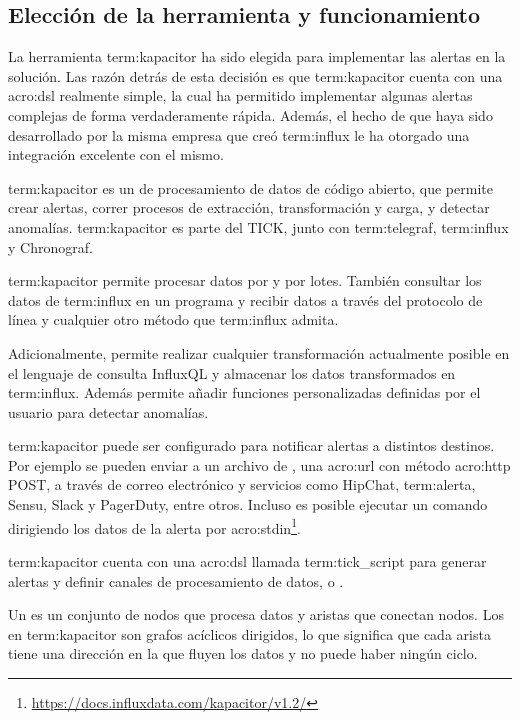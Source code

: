 \subsection{Elección de la herramienta y funcionamiento}
\label{eleccion-herramienta}

La herramienta \gls{term:kapacitor} ha sido elegida para implementar las alertas
en la solución. Las razón detrás de esta decisión es que
\gls{term:kapacitor} cuenta con una \gls{acro:dsl} realmente simple, la cual
ha permitido implementar algunas alertas complejas de forma verdaderamente
rápida. Además, el hecho de que haya sido desarrollado por la misma empresa
que creó \gls{term:influx} le ha otorgado una integración excelente con el
mismo.

\gls{term:kapacitor} es un  de procesamiento de datos de código
abierto, que permite crear alertas, correr procesos de extracción,
transformación y carga, y detectar anomalías. \gls{term:kapacitor} es parte del
 TICK, junto con \gls{term:telegraf}, \gls{term:influx} y Chronograf.

\gls{term:kapacitor} permite procesar datos por  y por lotes. También
consultar los datos de \gls{term:influx} en un programa y recibir datos a
través del protocolo de línea y cualquier otro método que \gls{term:influx}
admita.

Adicionalmente, permite realizar cualquier transformación actualmente posible en
el lenguaje de consulta InfluxQL y almacenar los datos transformados en
\gls{term:influx}. Además permite añadir funciones personalizadas definidas por
el usuario para detectar anomalías.

\gls{term:kapacitor} puede ser configurado para notificar alertas a distintos
destinos. Por ejemplo se pueden enviar a un archivo de , una \gls{acro:url} con
método \gls{acro:http} POST, a través de correo electrónico y servicios como
HipChat, \gls{term:alerta}, Sensu, Slack y PagerDuty, entre otros. Incluso es
posible ejecutar un comando dirigiendo los datos de la alerta por
\gls{acro:stdin}\footnote{\url{https://docs.influxdata.com/kapacitor/v1.2/}}.

\gls{term:kapacitor} cuenta con una \gls{acro:dsl} llamada \gls{term:tick_script} para
generar alertas y definir canales de procesamiento de datos, o .

Un  es un conjunto de nodos que procesa datos y
aristas que conectan nodos. Los  en \gls{term:kapacitor} son grafos
acíclicos dirigidos, lo que significa que cada arista tiene una dirección en la
que fluyen los datos y no puede haber ningún ciclo.


